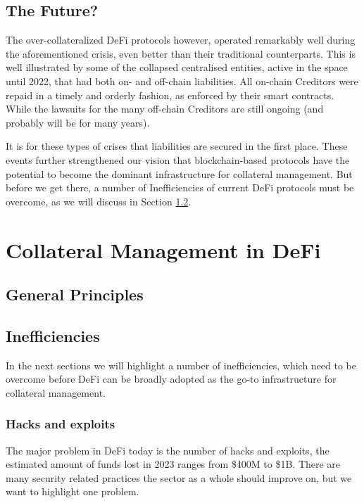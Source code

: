 \documentclass[sigconf,nonacm]{acmart}
\begin{document}
\subsection{The Future?}
The over-collateralized DeFi protocols however, operated remarkably well during the aforementioned crisis, even better than their traditional counterparts.
This is well illustrated by some of the collapsed centralised entities, active in the space until 2022, that had both on- and off-chain liabilities.
All on-chain Creditors were repaid in a timely and orderly fashion, as enforced by their smart contracts.
While the lawsuits for the many off-chain Creditors are still ongoing (and probably will be for many years).

It is for these types of crises that liabilities are secured in the first place.
These events further strengthened our vision that blockchain-based protocols have the potential to become the dominant infrastructure for collateral management.
But before we get there, a number of Inefficiencies of current DeFi protocols must be overcome, as we will discuss in Section \ref{subsec:inefficiencies}.

\section{Collateral Management in DeFi}
\subsection{General Principles}

\subsection{Inefficiencies}
\label{subsec:inefficiencies}

In the next sections we will highlight a number of inefficiencies,
which need to be overcome before DeFi can be broadly adopted as the go-to infrastructure for collateral management.

\subsubsection{Hacks and exploits}
\label{subsubsec:hacks-and-exploits}

The major problem in DeFi today is the number of hacks and exploits, the estimated amount of funds lost in 2023 ranges from \$400M to \$1B.
There are many security related practices the sector as a whole should improve on, but we want to highlight one problem.
\end{document}
